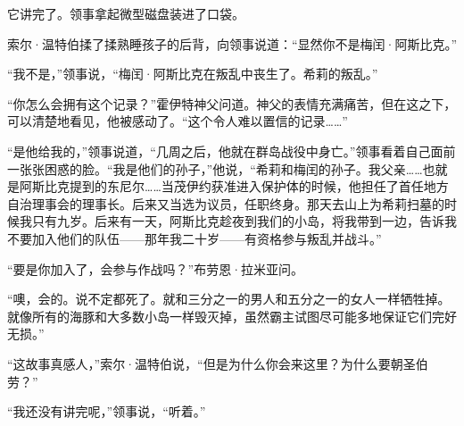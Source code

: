 \documentclass[AutoFakeBold=true]{book}
\begin{document}
它讲完了。领事拿起微型磁盘装进了口袋。

索尔·温特伯揉了揉熟睡孩子的后背，向领事说道：``显然你不是梅闰·阿斯比克。''

``我不是，''领事说，``梅闰·阿斯比克在叛乱中丧生了。希莉的叛乱。''

``你怎么会拥有这个记录？''霍伊特神父问道。神父的表情充满痛苦，但在这之下，可以清楚地看见，他被感动了。``这个令人难以置信的记录……''

``是他给我的，''领事说道，``几周之后，他就在群岛战役中身亡。''领事看着自己面前一张张困惑的脸。``我是他们的孙子，''他说，``希莉和梅闰的孙子。我父亲……也就是阿斯比克提到的东尼尔……当茂伊约获准进入保护体的时候，他担任了首任地方自治理事会的理事长。后来又当选为议员，任职终身。那天去山上为希莉扫墓的时候我只有九岁。后来有一天，阿斯比克趁夜到我们的小岛，将我带到一边，告诉我不要加入他们的队伍——那年我二十岁——有资格参与叛乱并战斗。''

``要是你加入了，会参与作战吗？''布劳恩·拉米亚问。

``噢，会的。说不定都死了。就和三分之一的男人和五分之一的女人一样牺牲掉。就像所有的海豚和大多数小岛一样毁灭掉，虽然霸主试图尽可能多地保证它们完好无损。''

``这故事真感人，''索尔·温特伯说，``但是为什么你会来这里？为什么要朝圣伯劳？''

``我还没有讲完呢，''领事说，``听着。''

\vspace*{1em}
\end{document}
